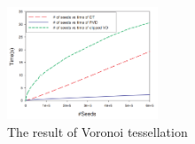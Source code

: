 \begin{itemize}
\begin{figure}[ht!]
        \centering
        \includegraphics[width=0.4\textwidth]{img/clipped}
        \caption{The result of Voronoi tessellation}
        \label{voro}
    \end{figure}
\end{itemize}



